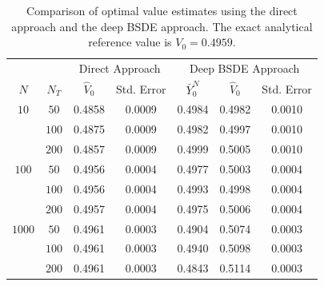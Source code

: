 \documentclass[11pt]{article}
\numberwithin{equation}{section}
\theoremstyle{plain}
\theoremstyle{definition}
\theoremstyle{remark}
\begin{document}
	
	\begin{table}[htbp!]
		\centering
		\begin{tabular}{cc|cc|ccc}
			\hline
			& & \multicolumn{2}{c|}{Direct Approach} & \multicolumn{3}{c}{Deep BSDE Approach} \\
			$N$ & $N_T$ & $\hat{V}_0$ & Std. Error & $\bar{Y}_0^N$ & $\hat{V}_0$ & Std. Error \\
			\hline 
			$10$ & $50$ & 0.4858 & 0.0009 & 0.4984 & 0.4982 & 0.0010 \\
			& $100$ & 0.4875 & 0.0009 & 0.4982 & 0.4997 & 0.0010 \\
			& $200$ & 0.4857 & 0.0009 & 0.4999 & 0.5005 & 0.0010 \\
			\hline
			$100$ & $50$ & 0.4956 & 0.0004 & 0.4977 & 0.5003 & 0.0004 \\
			& $100$ & 0.4956 & 0.0004 & 0.4993 & 0.4998 & 0.0004 \\
			& $200$ & 0.4957 & 0.0004 & 0.4975 & 0.5006 & 0.0004 \\
			\hline
			$1000$ & $50$ & 0.4961 & 0.0003 & 0.4904 & 0.5074 & 0.0003 \\
			& $100$ & 0.4961 & 0.0003 & 0.4940 & 0.5098 & 0.0003 \\
			& $200$ & 0.4961 & 0.0003 & 0.4843 & 0.5114 & 0.0003  \\
			\hline
		\end{tabular}
		\caption{Comparison of optimal value estimates using the direct approach and the deep BSDE approach. The exact analytical reference value is $V_0 = 0.4959$.}
		\label{tab:lq1-combined-optimal-value}
	\end{table}
	
	
\end{document}
